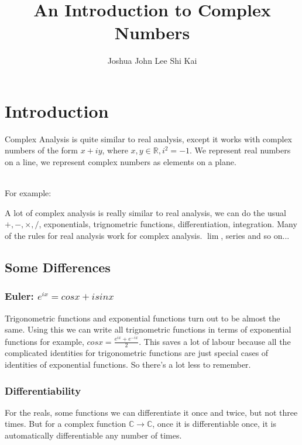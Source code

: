 \documentclass{article}
\title{An Introduction to Complex Numbers}
\author{Joshua John Lee Shi Kai}
\begin{document}
\maketitle

\newpage

\section{Introduction}
Complex Analysis is quite similar to real analysis, except it works with complex numbers of the form
$x + iy$, where $x, y \in \mathbb{R}, i^2 = -1$. We represent real numbers on a line, we represent complex
numbers as elements on a plane.

\noindent \\ For example:
\begin{center}

\end{center}

\noindent A lot of complex analysis is really similar to real analysis, we can do the usual $+, -, \times, /$,
exponentials, trignometric functions, differentiation, integration. Many of the rules for real analysis work for
complex analysis. $\lim$, series and so on...

\subsection{Some Differences}
\subsubsection{Euler: $e^{ix} = cosx + isinx$}
Trigonometric functions and exponential functions turn out to be almost the same.
Using this we can write all trignometric functions in terms of exponential functions for example,
$cosx = \frac{e^{ix} + e^{-ix}}{2}$. This saves a lot of labour because all the complicated identities
for trigonometric functions are just special cases of identities of exponential functions. So there's a lot
less to remember.
\subsubsection{Differentiability}
For the reals, some functions we can differentiate it once and twice, but not three times. But for a
complex function $\mathbb{C} \rightarrow \mathbb{C}$, once it is differentiable once, it is automatically
differentiable any number of times.
\end{document}
